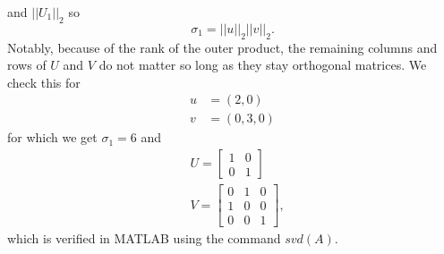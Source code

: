\documentclass{article}
\begin{document}
and $||U_1||_2$ so 
\begin{equation}
    \sigma_1 = ||u||_2 ||v||_2.
\end{equation}
Notably, because of the rank of the outer product, the remaining columns and rows of $U$ and $V$ do not matter so long as they stay orthogonal matrices. 
We check this for 
\begin{align}
    u &= (2,0) \\
    v &= (0,3,0)
\end{align}
for which we get $\sigma_1 = 6$ and
\begin{align}
    & U = 
    \begin{bmatrix}
    1 & 0\\
    0 & 1
    \end{bmatrix}
    \\
    & V =
    \begin{bmatrix}
    0 & 1 & 0 \\
    1 & 0 & 0 \\
    0 & 0 & 1
    \end{bmatrix},
\end{align}
which is verified in MATLAB using the command $svd(A)$.
\end{document}

